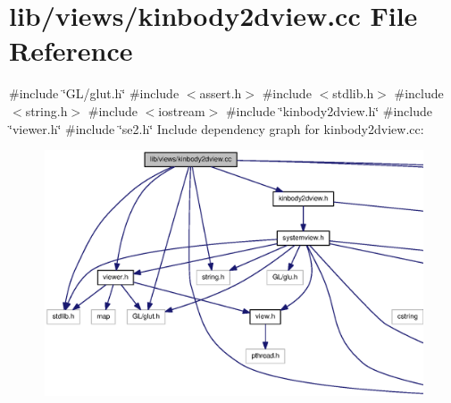 \section{lib/views/kinbody2dview.cc \-File \-Reference}
\label{kinbody2dview_8cc}
{\ttfamily \#include \char`\"{}\-G\-L/glut.\-h\char`\"{}}\*
{\ttfamily \#include $<$assert.\-h$>$}\*
{\ttfamily \#include $<$stdlib.\-h$>$}\*
{\ttfamily \#include $<$string.\-h$>$}\*
{\ttfamily \#include $<$iostream$>$}\*
{\ttfamily \#include \char`\"{}kinbody2dview.\-h\char`\"{}}\*
{\ttfamily \#include \char`\"{}viewer.\-h\char`\"{}}\*
{\ttfamily \#include \char`\"{}se2.\-h\char`\"{}}\*
\-Include dependency graph for kinbody2dview.\-cc\-:\nopagebreak
\begin{figure}[H]
\begin{center}
\leavevmode
\includegraphics[width=350pt]{kinbody2dview_8cc__incl}
\end{center}
\end{figure}
